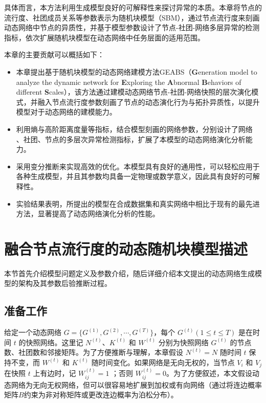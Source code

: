 

具体而言，本方法利用生成模型良好的可解释性来探讨异常的本质。本章将节点的流行度、社团成员关系等参数表示为随机块模型（SBM），通过节点流行度来刻画动态网络中节点的异质性，并基于模型参数设计了节点-社团-网络多层异常的检测指标，依次扩展随机块模型在动态网络中任务层面的适用范围。

本章的主要贡献可以概括如下：


\begin{itemize} 
    \item[$\bullet$] 本章提出基于随机块模型的动态网络建模方法GEABS（\textbf{G}eneration model to analyze the dynamic network for \textbf{E}xploring the \textbf{A}bnormal \textbf{B}ehaviors of different \textbf{S}cales），该方法通过建模动态网络节点-社团-网络快照的层次演化模式，并融入节点流行度参数刻画了节点的动态演化行为与拓扑异质性，以提升模型对于动态网络的建模能力。
    \item[$\bullet$] 利用熵与高阶距离度量等指标，结合模型刻画的网络参数，分别设计了网络 、社团、节点的多层次异常检测指标，扩展了本模型的动态网络演化分析能力。
    \item[$\bullet$] 采用变分推断来实现高效的优化。本模型具有良好的通用性，可以轻松应用于各种生成模型，并且其参数均具备一定物理或数学意义，因此具有良好的可解释性。 
    \item[$\bullet$] 实验结果表明，所提出的模型在合成数据集和真实网络中相比于现有的最先进方法，显著提高了动态网络演化分析的性能。
\end{itemize}


\section{融合节点流行度的动态随机块模型描述\label{chap4:model}}

\label{sec:method}
本节首先介绍模型问题定义及参数介绍，随后详细介绍本文提出的动态网络生成模型的架构及其参数后验推断过程。


\subsection{准备工作}
给定一个动态网络 $G =\{ G^{(1)}, G^{(2)}, \cdots, G^{(T)} \}$，每个 $G^{(t)} (1 \le t \le T)$ 是在时间 $t$ 的快照网络。这里记 $N^{(t)}$、$K^{(t)}$ 和 $W^{(t)}$ 分别为快照网络 $G^{(t)}$ 的节点数、社团数和邻接矩阵。为了方便推断与理解，本章假设 $N^{(t)} = N$ 随时间 $t$ 保持不变，而 $W^{(t)}$ 和 $K^{(t)}$ 随时间变化。如果网络是无向无权的，当节点 $V_i$ 和 $V_j$ 在快照 $t$ 上有边时，记 $W^{(t)}_{ij} = 1$ ；否则 $W^{(t)}_{ij} = 0$。为了方便叙述，本文假设动态网络为无向无权网络，但可以很容易地扩展到加权或有向网络（通过将连边概率矩阵$B$约束为非对称矩阵或更改连边概率为泊松分布）。

